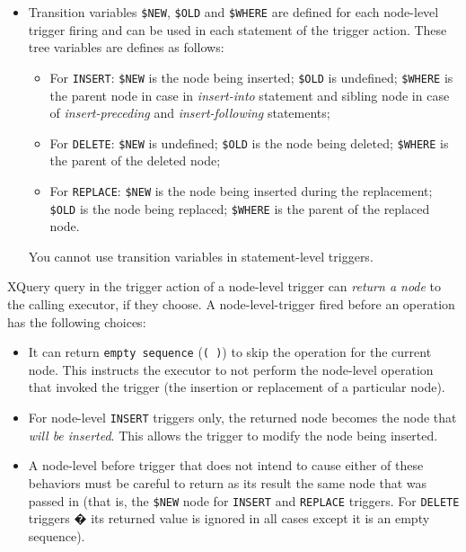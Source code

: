 \documentclass[a4paper,12pt]{article}
\begin{document}
\begin{itemize}
\item Transition variables \verb!$NEW!, \verb!$OLD! and \verb!$WHERE! are defined for each node-level trigger firing and can be used in each statement of the trigger action. These tree variables are defines as follows:
\begin{itemize}
\item For \verb!INSERT!: \verb!$NEW! is the node being inserted; \verb!$OLD! is undefined; \verb!$WHERE! is the parent node in case in \emph{insert-into} statement and sibling node in case of \emph{insert-preceding} and \emph{insert-following} statements;
\item For \verb!DELETE!: \verb!$NEW! is undefined; \verb!$OLD! is the node being deleted; \verb!$WHERE! is the parent of the deleted node;
\item For \verb!REPLACE!: \verb!$NEW! is the node being inserted during the replacement; \verb!$OLD! is the node being replaced; \verb!$WHERE! is the parent of the replaced node.
\end{itemize}
You cannot use transition variables in statement-level triggers.
\end{itemize}

XQuery query in the trigger action of a node-level trigger can \emph{return a node} to the calling executor, if they choose. A node-level-trigger fired before an operation has the following choices:

\begin{itemize}
\item It can return \verb!empty sequence! (\verb!( )!) to skip the operation for the current node. This instructs the executor to not perform the node-level operation that invoked the trigger (the insertion or replacement of a particular node).


\item For node-level \verb!INSERT! triggers only, the returned node becomes the node that \emph{will be inserted}. This allows the trigger to modify the node being inserted.

\item A node-level before trigger that does not intend to cause either of these behaviors must be careful to return as its result the same node that was passed in (that is, the \verb!$NEW! node for \verb!INSERT! and \verb!REPLACE! triggers. For \verb!DELETE! triggers � its returned value is ignored in all cases except it is an empty sequence).
\end{itemize}
\end{document}
